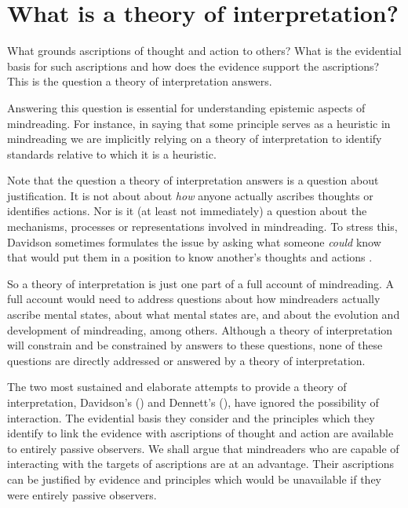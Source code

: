 \documentclass[12pt,a4paper]{extarticle}
\begin{document}
\setlength\footnotesep{1em}


\maketitle

\begin{abstract}
***
\end{abstract}


\section{What is a theory of interpretation?}
What grounds ascriptions of thought and action to others?
What is the evidential basis for such ascriptions and how does the evidence support the ascriptions?
This is the  question  a theory of interpretation answers.

Answering this question is essential for understanding epistemic aspects of mindreading.  
For instance, in saying that some principle serves as a heuristic in mindreading we are implicitly relying on a theory of interpretation to identify standards relative to which it is a heuristic.

Note that the question a theory of interpretation answers is a question about justification.
It is not about about \emph{how} anyone actually ascribes thoughts or identifies actions. 
Nor is it (at least not immediately) a question about the mechanisms, processes or representations involved in mindreading.
To stress this, Davidson sometimes formulates the issue by asking what someone \emph{could} know that would put them in a position to know another's thoughts and actions \citep[e.g.][p.\ 126]{Davidson:1973jx}.

So a theory of interpretation is just one part of a full account of mindreading.
A full account would need to address questions 
about how mindreaders actually ascribe mental states, 
about what mental states are, 
and 
about the evolution and development of mindreading,
among others.
Although a theory of interpretation will constrain and be constrained by answers to these questions,
none of these questions are directly addressed or answered by a theory of interpretation.

The two most sustained and elaborate attempts to provide a theory of interpretation,
Davidson's (\citeyear{Davidson:1984wh}) and Dennett's (\citeyear{Dennett:1987sf}),
have ignored the possibility of interaction.
The evidential basis they consider and the principles which they identify to link the evidence with ascriptions of thought and action are available to entirely passive observers.
We shall argue that mindreaders who are capable of interacting with the targets of ascriptions are at an advantage.
Their ascriptions can be justified by evidence and principles which would be unavailable if they were entirely passive observers.
\end{document}
